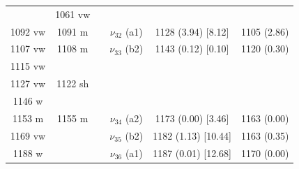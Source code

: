 \begin{table}[H]
\begin{center}
\begin{tabular}{c c c c c c}
 & 1061 vw &  &  &  &  \\ 
 1092 vw & 1091 m &  & $\nu_{32}$ (a1)
 & 1128 (3.94) [8.12] & 1105 (2.86) \\ 
 1107 vw  & 1108 m &  & $\nu_{33}$ (b2) & 1143 (0.12) [0.10] & 1120 (0.30) \\ 
 1115 vw &  &  &  &  &  \\ 
 1127 vw & 1122 sh &  &  &  & \multicolumn{1}{l}{} \\ 
 1146 w &  &  &  & \multicolumn{1}{l}{} &  \\ 
 1153 m & 1155 m &  & $\nu_{34}$ (a2) & 1173 (0.00) [3.46] & 1163 (0.00) \\ 
 	1169 vw &  & \multicolumn{1}{l}{} & $\nu_{35}$ (b2) & \multicolumn{1}{l}{1182 (1.13) [10.44]} & 1163 (0.35) \\ 
 	1188 w &  & \multicolumn{1}{l}{} & $\nu_{36}$ (a1) & \multicolumn{1}{l}{1187 (0.01) [12.68]} & 1170 (0.00) \\ 
  \bottomrule
\end{tabular}
\end{center}
\end{table}
 
 
 
